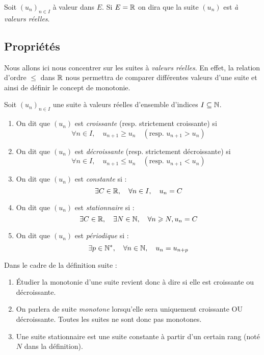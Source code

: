 \begin{proposition}
    Soit $(u_n)_{n \in I}$ à valeur dans $E$. Si $E = \mathbb{R}$ on dira que la suite $(u_n)$ est 
    \emph{à valeurs réelles}. 
\end{proposition}

\subsection{Propriétés}

Nous allons ici nous concentrer sur les suites à \emph{valeurs réelles}. 
En effet, la relation d'ordre $\leqslant$ dans $\mathbb{R}$ nous permettra de comparer différentes valeurs 
d'une suite et ainsi de définir le concept de monotonie. 

\begin{definition}[Monotonie]
    Soit $(u_n)_{n \in I}$ une suite à valeurs réelles d'ensemble d'indices $I \subseteq \mathbb{N}$. 
    \begin{enumerate}
        \item On dit que $(u_n)$ est \emph{croissante} (resp. strictement croissante) si 
            \[ \forall n \in I, \quad u_{n+1} \geqslant u_n \quad (\text{resp. } u_{n+1} > u_n) \] 
        \item On dit que $(u_n)$ est \emph{décroissante} (resp. strictement décroissante) si 
            \[ \forall n \in I, \quad u_{n+1} \leqslant u_n \quad (\text{resp. } u_{n+1} < u_n) \] 
        \item On dit que $(u_n)$ est \emph{constante} si : 
            \[ \exists C \in \mathbb{R}, \quad \forall n \in I, \quad u_n = C \] 
        \item On dit que $(u_n)$ est \emph{stationnaire} si : 
            \[ \exists C \in \mathbb{R}, \quad \exists N \in \mathbb{N}, \quad \forall n \geqslant N, u_n = C \] 
        \item On dit que $(u_n)$ est \emph{périodique} si : 
            \[ \exists p \in \mathbb{N}^*, \quad \forall n \in \mathbb{N}, \quad u_n = u_{n+p} \] 
    \end{enumerate}
\end{definition}

\begin{remark}
    Dans le cadre de la définition suite : 
    \begin{enumerate}
        \item Étudier la monotonie d'une suite revient donc à dire si elle est croissante ou décroissante. 
        \item On parlera de suite \emph{monotone} lorsqu'elle sera uniquement croissante OU décroissante. 
            Toutes les suites ne sont donc pas monotones. 
        \item Une suite stationnaire est une suite constante à partir d'un certain rang (noté $N$ dans la définition). 
    \end{enumerate}
\end{remark}


